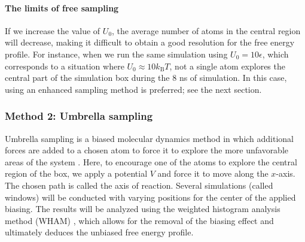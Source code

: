 \documentclass[9pt,tutorial]{livecoms}
\begin{document}
\paragraph{The limits of free sampling}
If we increase the value of $U_0$, the average number of atoms in the central
region will decrease, making it difficult to obtain a good resolution for the free
energy profile. For instance, when we run the same simulation using $U_0 = 10 \epsilon$,
which corresponds to a situation where $U_0 \approx 10 k_\text{B} T$, not a single
atom explores the central part of the simulation box during the 8 ns of simulation.
In this case, using an enhanced sampling method is preferred; see the next section.

\subsubsection{Method 2: Umbrella sampling}
Umbrella sampling is a biased molecular dynamics method in which additional forces
are added to a chosen atom to force it to explore the more unfavorable areas of
the system \cite{kastner2011umbrella, allen2017computer, frenkel2023understanding}.
Here, to encourage one of the atoms to explore the central region of the box,
we apply a potential $V$ and force it to move along the $x$-axis. The chosen path
is called the axis of reaction. Several simulations (called windows) will be
conducted with varying positions for the center of the applied biasing. The results
will be analyzed using the weighted histogram analysis method (WHAM) \cite{kumar1992weighted},
which allows for the removal of the biasing effect and ultimately deduces the
unbiased free energy profile.
\end{document}
